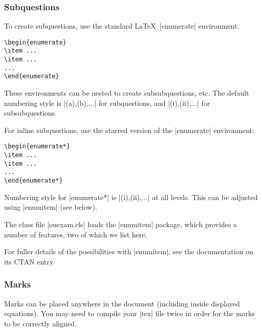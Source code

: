 \documentclass[a4paper]{ltxguide}
\newcommand\3{\unskip\enspace\fbox{\fontsize{4}{4}\selectfont NEW 3.0}}
\begin{document}
\subsubsection{Subquestions}
To create subquestions, use the standard \LaTeX\ |enumerate| environment.

\begin{verbatim}
\begin{enumerate}
\item ...
\item ...
...
\end{enumerate}
\end{verbatim}

These environments can be nested to create subsubquestions, etc. The default numbering style is |(a),(b),...| for subquestions, and |(i),(ii),...| for subsubquestions.

For inline subquestions, use the starred version of the |enumerate| environment:

\begin{verbatim}
\begin{enumerate*}
\item ...
\item ...
...
\end{enumerate*}
\end{verbatim}

Numbering style for |enumerate*| is |(i),(ii),...| at all levels. This can be adjusted using |enumitem| (see below).

The class file |ouexam.cls| loads the |enumitem| package, which provides a number of features, two of which we list here.


For fuller details of the possibilities with |enumitem|, see the documentation on its CTAN entry.

\subsubsection{Marks}
Marks can be placed anywhere in the document (including inside displayed equations). You may need to  compile your |tex| file twice in order for the marks to be correctly aligned.
\end{document}
